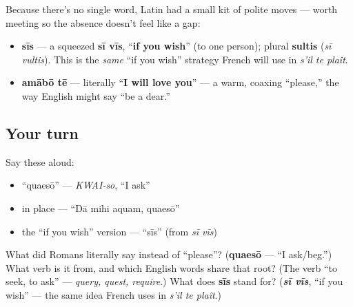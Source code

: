 \begin{culture}
Because there's no single word, Latin had a small kit of polite moves — worth meeting so the absence doesn't feel like a gap:

\begin{itemize}
\raggedright
  \item \textbf{sīs} — a squeezed \textbf{sī vīs}, \textquotedblleft{}\textbf{if you wish}\textquotedblright{} (to one person); plural \textbf{sultis} (\emph{sī vultis}). This is the \emph{same} \textquotedblleft{}if you wish\textquotedblright{} strategy French will use in \emph{s'il te plaît}.
  \item \textbf{amābō tē} — literally \textquotedblleft{}\textbf{I will love you}\textquotedblright{} — a warm, coaxing \textquotedblleft{}please,\textquotedblright{} the way English might say \textquotedblleft{}be a dear.\textquotedblright{}
\end{itemize}
\end{culture}

\subsection*{Your turn}
Say these aloud:

\begin{itemize}
\raggedright
  \item \textquotedblleft{}quaesō\textquotedblright{} — \emph{KWAI-so}, \textquotedblleft{}I ask\textquotedblright{}
  \item in place — \textquotedblleft{}Dā mihi aquam, quaesō\textquotedblright{}
  \item the \textquotedblleft{}if you wish\textquotedblright{} version — \textquotedblleft{}sīs\textquotedblright{} (from \emph{sī vīs})
\end{itemize}

\begin{tcolorbox}[breakable,colback=teal!4,colframe=teal!35!black,title={Before you move on}]
What did Romans literally say instead of \textquotedblleft{}please\textquotedblright{}? (\textbf{quaesō} — \textquotedblleft{}I ask/beg.\textquotedblright{}) What verb is it from, and which English words share that root? (The verb \textquotedblleft{}to seek, to ask\textquotedblright{} — \emph{query, quest, require}.) What does \textbf{sīs} stand for? (\emph{\textbf{sī vīs}}, \textquotedblleft{}if you wish\textquotedblright{} — the same idea French uses in \emph{s'il te plaît}.)
\end{tcolorbox}
